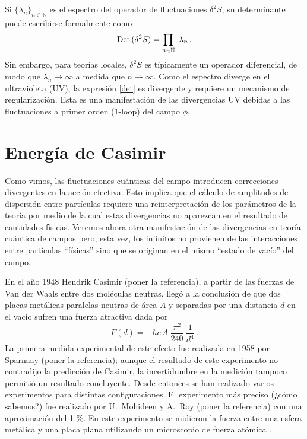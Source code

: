 Si $ \{ \lambda _n \} _{n \in \mathbb N}$ es el espectro del operador de fluctuaciones $ \delta ^2 S $, su determinante puede escribirse formalmente como
\begin{equation}\label{det}
{\rm Det}\,(\delta ^2 S) = \prod_{ n \in \mathbb N }\ \lambda _n\,.
\end{equation}
Sin embargo, para teorías locales, $\delta ^2 S$ es típicamente un operador diferencial, de modo que $\lambda_n\to\infty$ a medida que $n\to \infty$. Como el espectro diverge en el ultravioleta (UV), la expresión \eqref{det} es divergente y requiere un mecanismo de regularización. Esta es una manifestación de las divergencias UV debidas a las fluctuaciones a primer orden (1-loop) del campo $\phi$.


\section{Energía de Casimir}

{\red Como vimos, las fluctuaciones cuánticas del campo introducen correcciones divergentes en la acción efectiva. Esto implica que el cálculo de amplitudes de dispersión entre partículas requiere una reinterpretación de los parámetros de la teoría por medio de la cual estas divergencias no aparezcan en el resultado de cantidades físicas. Veremos ahora otra manifestación de las divergencias en teoría cuántica de campos pero, esta vez, los infinitos no provienen de las interacciones entre partículas ``físicas'' sino que se originan en el mismo ``estado de vacío'' del campo.}


En el año 1948 Hendrik Casimir ({\red poner la referencia}), a partir de las fuerzas de Van der Waals entre dos moléculas neutras, llegó a la conclusión de que dos placas metálicas paralelas neutras de área $A$ y separadas por una distancia $d$ en el vacío sufren una fuerza atractiva dada por
\begin{equation}
		F(d) = - \hbar c\,A\ \frac{\pi ^2 }{240}\ \frac{1}{d^4}\,.
	\label{casimir.1}
\end{equation}
La primera medida experimental de este efecto fue realizada en 1958 por Sparnaay ({\red poner la referencia}); aunque el resultado de este experimento no contradijo la predicción de Casimir, la incertidumbre en la medición tampoco permitió un resultado concluyente. Desde entonces se han realizado varios experimentos para distintas configuraciones. El experimento más preciso ({\red ¿cómo sabemos?}) fue realizado por U.\ Mohideen y A.\ Roy ({\red poner la referencia}) con una aproximación del 1 \%. En este experimento se midieron la fuerza entre una esfera metálica y una placa plana utilizando un microscopio de fuerza atómica \cite{BORDAG20011} .

